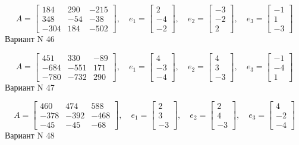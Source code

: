 \documentclass[11pt]{report}
\begin{document}
$$A = \left[\begin{matrix}184 & 290 & -215\\348 & -54 & -38\\-304 & 184 & -502\end{matrix}\right],\quad e_1 = \left[\begin{matrix}2\\-4\\-2\end{matrix}\right],\quad e_2 = \left[\begin{matrix}-3\\-2\\2\end{matrix}\right],\quad e_3 = \left[\begin{matrix}-1\\1\\-3\end{matrix}\right]$$Вариант N 46

$$A = \left[\begin{matrix}451 & 330 & -89\\-684 & -551 & 171\\-780 & -732 & 290\end{matrix}\right],\quad e_1 = \left[\begin{matrix}4\\-3\\-4\end{matrix}\right],\quad e_2 = \left[\begin{matrix}4\\3\\-3\end{matrix}\right],\quad e_3 = \left[\begin{matrix}-1\\-4\\1\end{matrix}\right]$$Вариант N 47

$$A = \left[\begin{matrix}460 & 474 & 588\\-378 & -392 & -468\\-45 & -45 & -68\end{matrix}\right],\quad e_1 = \left[\begin{matrix}2\\3\\-3\end{matrix}\right],\quad e_2 = \left[\begin{matrix}2\\4\\-3\end{matrix}\right],\quad e_3 = \left[\begin{matrix}4\\-2\\-4\end{matrix}\right]$$Вариант N 48
\end{document}
